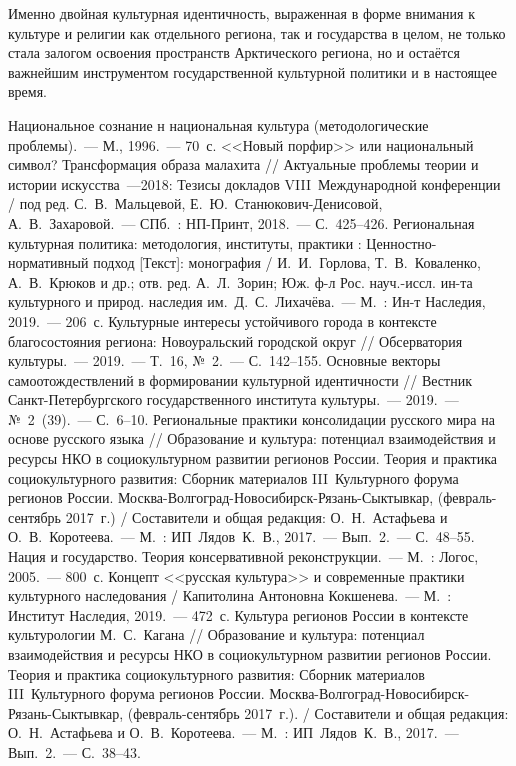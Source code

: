 Именно двойная культурная идентичность, выраженная в форме внимания к культуре и религии как отдельного региона, так и государства в целом, не только стала залогом освоения пространств Арктического региона, но и остаётся важнейшим инструментом государственной культурной политики и в настоящее время.

\begin{thebibliography}{99}
\bibitem{} Национальное сознание н национальная культура (методологические проблемы).~--- М., 1996.~--- 70~с.
\bibitem{} <<Новый порфир>> или национальный символ? Трансформация образа малахита  // Актуальные проблемы теории и истории искусства~---2018: Тезисы докладов VIII~Международной конференции / под ред. С.~В.~Мальцевой, Е.~Ю.~Станюкович-Денисовой, А.~В.~Захаровой.~--- СПб.~: НП-Принт, 2018.~--- С.~425--426.
\bibitem{}Региональная культурная политика: методология, институты, практики : Ценностно-нормативный подход [Текст]: монография / И.~И.~Горлова, Т.~В.~Коваленко, А.~В.~Крюков и др.; отв. ред. А.~Л.~Зорин; Юж. ф-л Рос. науч.-иссл. ин-та культурного и природ. наследия им.~Д.~С.~Лихачёва.~--- М.~: Ин-т Наследия, 2019.~--- 206~с.
\bibitem{} Культурные интересы устойчивого города в контексте благосостояния региона: Новоуральский городской округ // Обсерватория культуры.~--- 2019.~--- Т.~16, №~2.~--- С.~142--155.
\bibitem{} Основные векторы самоотождествлений в формировании культурной идентичности // Вестник Санкт-Петербургского государственного института культуры.~--- 2019.~--- №~2~(39).~--- С.~6--10.
\bibitem{} Региональные практики консолидации русского мира на основе русского языка // Образование и культура: потенциал взаимодействия и ресурсы НКО в социокультурном развитии регионов России. Теория и практика социокультурного развития: Сборник материалов III~Культурного форума регионов России. Москва-Волгоград-Новосибирск-Рязань-Сыктывкар, (февраль-сентябрь 2017~г.) / Составители и общая редакция: О.~Н.~Астафьева и О.~В.~Коротеева.~--- М.~: ИП~Лядов~К.~В., 2017.~--- Вып.~2.~--- С.~48--55.
\bibitem{} Нация и государство. Теория консервативной реконструкции.~--- М.~: Логос, 2005.~--- 800~с.
\bibitem{}Концепт <<русская культура>> и современные практики культурного наследования / Капитолина Антоновна Кокшенева.~--- М.~: Институт Наследия, 2019.~--- 472~с.
\bibitem{} Культура регионов России в контексте культурологии М.~С.~Кагана // Образование и культура: потенциал взаимодействия и ресурсы НКО в социокультурном развитии регионов России. Теория и практика социокультурного развития: Сборник материалов III~Культурного форума регионов России. Москва-Волгоград-Новосибирск-Рязань-Сыктывкар, (февраль-сентябрь 2017~г.). / Составители и общая редакция: О.~Н.~Астафьева и О.~В.~Коротеева.~--- М.~: ИП~Лядов~К.~В., 2017.~--- Вып.~2.~--- С.~38--43.

\end{thebibliography}
